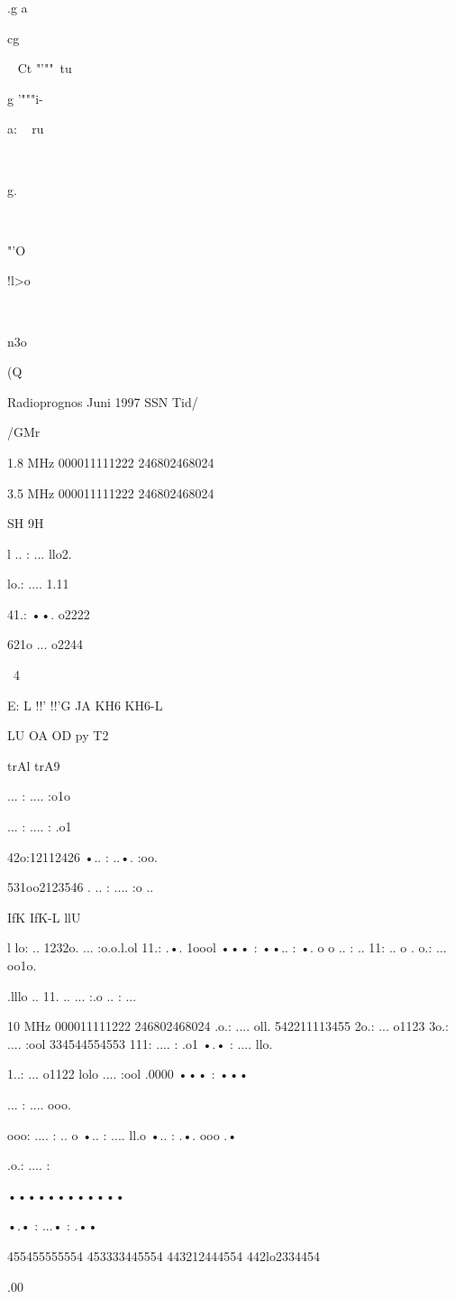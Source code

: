 .g
a

cg

~
Ct
"'""\
tu

g
'"""i-

a:
~
ru

~

g.
~

~

"'O

!l>o

~

n3o

(Q

Radioprognos Juni 1997 SSN
Tid/

/GMr

1.8 MHz
000011111222
246802468024

3.5 MHz
000011111222
246802468024

SH
9H

l .. : ... llo2.

lo.: .... 1.11

41.: ••. o2222

621o ... o2244

~4

E: L
!!'
!!'G
JA
KH6
KH6-L

LU
OA
OD
py
T2

trAl
trA9

... : .... :o1o

... : .... : .o1

42o:12112426
•.. : ..•. :oo.

531oo2123546
. .. : .... :o ..

IfK
IfK-L
llU

l lo: .. 1232o.
... :o.o.l.ol
11.: .•. 1oool
••• : ••.. : •. o
o .. : .. 11: .. o
. o.: ... oo1o.

.lllo .. 11. ..
... :.o .. : ...

10 MHz
000011111222
246802468024
.o.: .... oll.
542211113455
2o.: ... o1123
3o.: .... :ool
334544554553
111: .... : .o1
•.• : .... llo.

1..: ... o1122
lolo .... :ool
.0000 ••• : •••

... : .... ooo.

ooo: .... : .. o
•.. : .... ll.o
•.. : .•. ooo .•

.o.: .... :

••••••••••••

•.• : ...• : .••

455455555554
453333445554
443212444554
442lo2334454

.00

